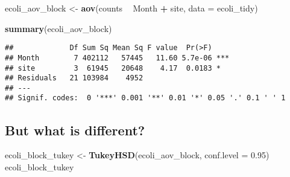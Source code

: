 \documentclass[]{book}
\newenvironment{Shaded}{\begin{snugshade}}{\end{snugshade}}
\newcommand{\DataTypeTok}[1]{\textcolor[rgb]{0.13,0.29,0.53}{#1}}
\newcommand{\FloatTok}[1]{\textcolor[rgb]{0.00,0.00,0.81}{#1}}
\newcommand{\KeywordTok}[1]{\textcolor[rgb]{0.13,0.29,0.53}{\textbf{#1}}}
\newcommand{\NormalTok}[1]{#1}
\newcommand{\OperatorTok}[1]{\textcolor[rgb]{0.81,0.36,0.00}{\textbf{#1}}}
\newcommand{\StringTok}[1]{\textcolor[rgb]{0.31,0.60,0.02}{#1}}
\theoremstyle{definition}
\theoremstyle{definition}
\theoremstyle{definition}
\theoremstyle{remark}
\begin{document}
\begin{Shaded}
\begin{Highlighting}[]
\NormalTok{ecoli_aov_block <-}\StringTok{ }\KeywordTok{aov}\NormalTok{(counts }\OperatorTok{~}\StringTok{ }\NormalTok{Month }\OperatorTok{+}\StringTok{ }\NormalTok{site, }\DataTypeTok{data =}\NormalTok{ ecoli_tidy)}

\KeywordTok{summary}\NormalTok{(ecoli_aov_block)}
\end{Highlighting}
\end{Shaded}

\begin{verbatim}
##             Df Sum Sq Mean Sq F value  Pr(>F)    
## Month        7 402112   57445   11.60 5.7e-06 ***
## site         3  61945   20648    4.17  0.0183 *  
## Residuals   21 103984    4952                    
## ---
## Signif. codes:  0 '***' 0.001 '**' 0.01 '*' 0.05 '.' 0.1 ' ' 1
\end{verbatim}

\hypertarget{but-what-is-different}{%
\subsection{But what is different?}\label{but-what-is-different}}

\begin{Shaded}
\begin{Highlighting}[]
\NormalTok{ecoli_block_tukey <-}\StringTok{ }\KeywordTok{TukeyHSD}\NormalTok{(ecoli_aov_block, }\DataTypeTok{conf.level =} \FloatTok{0.95}\NormalTok{)}
\NormalTok{ecoli_block_tukey}
\end{Highlighting}
\end{Shaded}
\end{document}
